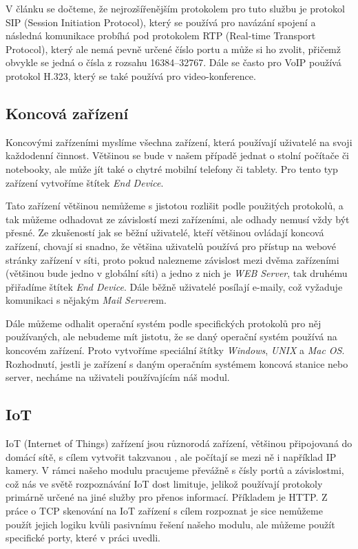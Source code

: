 \documentclass[thesis=B,czech,hidelinks]{FITthesis}[2019/03/21]
\begin{document}
        V článku \cite{VOIPP} se dočteme, že nejrozšířenějším protokolem pro tuto službu je protokol SIP (Session Initiation Protocol), který se používá pro navázání spojení a následná komunikace probíhá pod protokolem RTP (Real-time Transport Protocol), který ale nemá pevně určené číslo portu a může si ho zvolit, přičemž obvykle se jedná o čísla z rozsahu 16384--32767. Dále se často pro VoIP používá protokol H.323, který se také používá pro video-konference.
        
        \subsection{Koncová zařízení}
        Koncovými zařízeními myslíme všechna zařízení, která používají uživatelé na svoji každodenní činnost. Většinou se bude v našem případě jednat o stolní počítače či notebooky, ale může jít také o chytré mobilní telefony či tablety. Pro tento typ zařízení vytvoříme štítek \emph{End Device}.
        
        Tato zařízení většinou nemůžeme s jistotou rozlišit podle použitých protokolů, a tak můžeme odhadovat ze závislostí mezi zařízeními, ale odhady nemusí vždy být přesné. Ze zkušeností jak se běžní uživatelé, kteří většinou ovládají koncová zařízení, chovají si snadno, že většina uživatelů používá pro přístup na webové stránky zařízení v síti, proto pokud nalezneme závislost mezi dvěma zařízeními (většinou bude jedno v globální síti) a jedno z nich je \emph{WEB Server}, tak druhému přiřadíme štítek \emph{End Device}. Dále běžně uživatelé posílají e-maily, což vyžaduje komunikaci s nějakým \emph{Mail Server}em.
        
        Dále můžeme odhalit operační systém podle specifických protokolů pro něj používaných, ale nebudeme mít jistotu, že se daný operační systém používá na koncovém zařízení. Proto vytvoříme speciální štítky \emph{Windows}, \emph{UNIX} a \emph{Mac OS}. Rozhodnutí, jestli je zařízení s daným operačním systémem koncová stanice nebo server, necháme na uživateli používajícím náš modul.
        \subsection{IoT}
        IoT (Internet of Things) zařízení jsou různorodá zařízení, většinou připojovaná do domácí sítě, s cílem vytvořit takzvanou , ale počítají se mezi ně i například IP kamery. V rámci našeho modulu pracujeme převážně s čísly portů a závislostmi, což nás ve světě rozpoznávání IoT dost limituje, jelikož používají protokoly primárně určené na jiné služby pro přenos informací. Příkladem je HTTP. Z práce o TCP skenování na IoT zařízení \cite{IoT} s cílem rozpoznat je sice nemůžeme použít jejich logiku kvůli pasivnímu řešení našeho modulu, ale můžeme použít specifické porty, které v práci uvedli.
        
\end{document}
